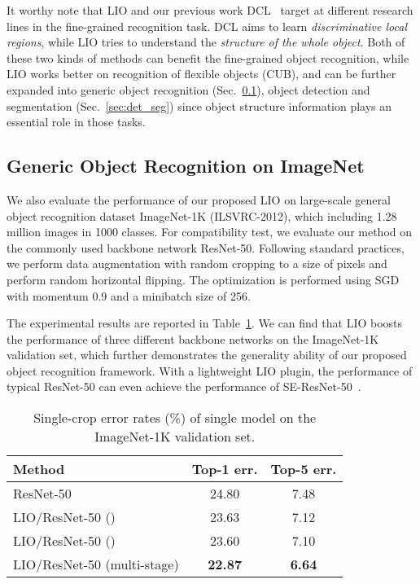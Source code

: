 \documentclass[10pt,twocolumn,letterpaper]{article}
\begin{document}
It worthy note that LIO and our previous work DCL~\cite{chen2019destruction} target at different research lines in the fine-grained recognition task. DCL aims to learn \textit{discriminative local regions}, while LIO tries to understand the \textit{structure of the whole object}. Both of these two kinds of methods can benefit the fine-grained object recognition, while LIO works better on recognition of flexible objects (CUB), and can be further expanded into generic object recognition (Sec.~\ref{sec:generic_recog}), object detection and segmentation (Sec.~\ref{sec:det_seg}) since object structure information plays an essential role in those tasks. 


\subsection{Generic Object Recognition on ImageNet}\label{sec:generic_recog}
We also evaluate the performance of our proposed LIO on large-scale general object recognition dataset ImageNet-1K (ILSVRC-2012), which including 1.28 million images in 1000 classes. For compatibility test, we evaluate our method on the commonly used backbone network ResNet-50. Following standard practices, we perform data augmentation with random cropping to a size of  pixels and perform random horizontal flipping. 
The optimization is performed using SGD with momentum 0.9 and a minibatch size of 256. 

The experimental results are reported in Table~\ref{tab:exp-imagenet}. We can find that LIO boosts the performance of three different backbone networks on the ImageNet-1K validation set, which further demonstrates the generality ability of our proposed object recognition framework. With a lightweight LIO plugin, the performance of typical ResNet-50 can even achieve the performance of SE-ResNet-50~\cite{hu2018squeeze}.

\begin{table}[!t]
\small
\begin{center}
    \begin{tabular}{|l|cc|}
    \hline
    Method          & Top-1 err. & Top-5 err. \\
    \hline\hline
    ResNet-50~\cite{resnet}       & 24.80 & 7.48      \\
    LIO/ResNet-50 ()   & 23.63 & 7.12      \\
    LIO/ResNet-50 () & 23.60 & 7.10      \\
    LIO/ResNet-50 (multi-stage)   & \textbf{22.87} & \textbf{6.64}\\
    \hline
    \end{tabular}
\end{center}
\caption{Single-crop error rates (\%) of single model on the ImageNet-1K validation set.}
\label{tab:exp-imagenet}
\end{table}
\end{document}
